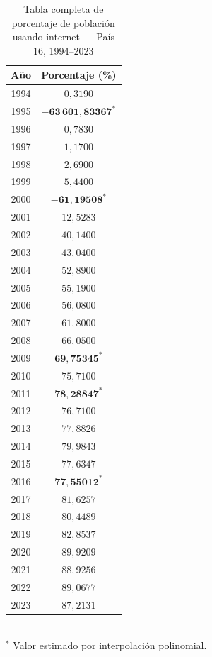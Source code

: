 \documentclass[12pt, letterpaper]{article}
\begin{document}
\begin{table}[H]
\centering
\caption{Tabla completa de porcentaje de población usando internet --- País 16, 1994--2023}
\label{tab:completa}
\small
\begin{tabular}{@{}cc@{}}
\toprule
\textbf{Año} & \textbf{Porcentaje (\%)} \\
\midrule
1994 & $0{,}3190$ \\
1995 & \textcolor{estimatedcolor}{$\mathbf{-63\,601{,}83367}^*$} \\
1996 & $0{,}7830$ \\
1997 & $1{,}1700$ \\
1998 & $2{,}6900$ \\
1999 & $5{,}4400$ \\
2000 & \textcolor{estimatedcolor}{$\mathbf{-61{,}19508}^*$} \\
2001 & $12{,}5283$ \\
2002 & $40{,}1400$ \\
2003 & $43{,}0400$ \\
2004 & $52{,}8900$ \\
2005 & $55{,}1900$ \\
2006 & $56{,}0800$ \\
2007 & $61{,}8000$ \\
2008 & $66{,}0500$ \\
2009 & \textcolor{estimatedcolor}{$\mathbf{69{,}75345}^*$} \\
2010 & $75{,}7100$ \\
2011 & \textcolor{estimatedcolor}{$\mathbf{78{,}28847}^*$} \\
2012 & $76{,}7100$ \\
2013 & $77{,}8826$ \\
2014 & $79{,}9843$ \\
2015 & $77{,}6347$ \\
2016 & \textcolor{estimatedcolor}{$\mathbf{77{,}55012}^*$} \\
2017 & $81{,}6257$ \\
2018 & $80{,}4489$ \\
2019 & $82{,}8537$ \\
2020 & $89{,}9209$ \\
2021 & $88{,}9256$ \\
2022 & $89{,}0677$ \\
2023 & $87{,}2131$ \\
\bottomrule
\end{tabular}
\\[0.3cm]
\footnotesize $^*$ Valor estimado por interpolación polinomial.
\end{table}
\end{document}

